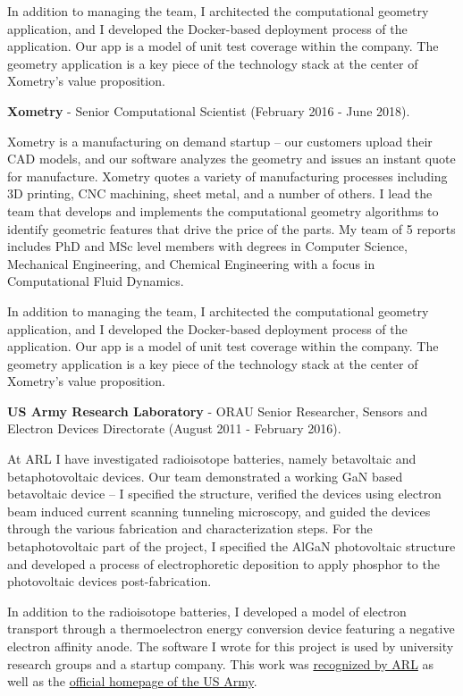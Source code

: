 In addition to managing the team, I architected the computational
geometry application, and I developed the Docker-based deployment
process of the application. Our app is a model of unit test coverage
within the company. The geometry application is a key piece of the
technology stack at the center of Xometry's value proposition.

\textbf{Xometry} - Senior Computational Scientist (February 2016 - June
2018).

Xometry is a manufacturing on demand startup -- our customers upload
their CAD models, and our software analyzes the geometry and issues an
instant quote for manufacture. Xometry quotes a variety of manufacturing
processes including 3D printing, CNC machining, sheet metal, and a
number of others. I lead the team that develops and implements the
computational geometry algorithms to identify geometric features that
drive the price of the parts. My team of 5 reports includes PhD and MSc
level members with degrees in Computer Science, Mechanical Engineering,
and Chemical Engineering with a focus in Computational Fluid Dynamics.

In addition to managing the team, I architected the computational
geometry application, and I developed the Docker-based deployment
process of the application. Our app is a model of unit test coverage
within the company. The geometry application is a key piece of the
technology stack at the center of Xometry's value proposition.

\textbf{US Army Research Laboratory} - ORAU Senior Researcher, Sensors
and Electron Devices Directorate (August 2011 - February 2016).

At ARL I have investigated radioisotope batteries, namely betavoltaic
and betaphotovoltaic devices. Our team demonstrated a working GaN based
betavoltaic device -- I specified the structure, verified the devices
using electron beam induced current scanning tunneling microscopy, and
guided the devices through the various fabrication and characterization
steps. For the betaphotovoltaic part of the project, I specified the
AlGaN photovoltaic structure and developed a process of electrophoretic
deposition to apply phosphor to the photovoltaic devices
post-fabrication.

In addition to the radioisotope batteries, I developed a model of
electron transport through a thermoelectron energy conversion device
featuring a negative electron affinity anode. The software I wrote for
this project is used by university research groups and a startup
company. This work was
\href{http://www.arl.army.mil/www/default.cfm?article=2462}{recognized
by ARL} as well as the
\href{http://www.army.mil/article/123473/Visiting_Army_scientist_makes_discoveries_in_emerging_technology/}{official
homepage of the US Army}.

